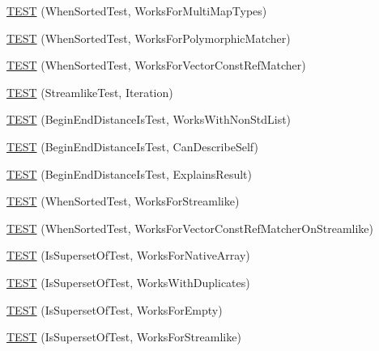\begin{DoxyCompactItemize}
\item 
\mbox{\hyperlink{namespacetesting_1_1gmock__matchers__test_ab5de36ad02781be67163ae24d08b5454}{T\+E\+ST}} (When\+Sorted\+Test, Works\+For\+Multi\+Map\+Types)
\item 
\mbox{\hyperlink{namespacetesting_1_1gmock__matchers__test_a587c3799433426782ccdcfe5cb07f5bc}{T\+E\+ST}} (When\+Sorted\+Test, Works\+For\+Polymorphic\+Matcher)
\item 
\mbox{\hyperlink{namespacetesting_1_1gmock__matchers__test_a0975bae51ce06a819dc1437134fd7f05}{T\+E\+ST}} (When\+Sorted\+Test, Works\+For\+Vector\+Const\+Ref\+Matcher)
\item 
\mbox{\hyperlink{namespacetesting_1_1gmock__matchers__test_a5aa4eed927d4a1a8ea306d5e47dce94f}{T\+E\+ST}} (Streamlike\+Test, Iteration)
\item 
\mbox{\hyperlink{namespacetesting_1_1gmock__matchers__test_add74820690e798ae8a365d08b68ddf71}{T\+E\+ST}} (Begin\+End\+Distance\+Is\+Test, Works\+With\+Non\+Std\+List)
\item 
\mbox{\hyperlink{namespacetesting_1_1gmock__matchers__test_aa4ef2a94a7d75aa6116e8537deaa5f56}{T\+E\+ST}} (Begin\+End\+Distance\+Is\+Test, Can\+Describe\+Self)
\item 
\mbox{\hyperlink{namespacetesting_1_1gmock__matchers__test_a89445da783c74dfa09c9c09531646f5b}{T\+E\+ST}} (Begin\+End\+Distance\+Is\+Test, Explains\+Result)
\item 
\mbox{\hyperlink{namespacetesting_1_1gmock__matchers__test_a8de8e3760418cfcd33913cd30f16d117}{T\+E\+ST}} (When\+Sorted\+Test, Works\+For\+Streamlike)
\item 
\mbox{\hyperlink{namespacetesting_1_1gmock__matchers__test_aa6bfe7b6cc288d93f60b9f52e095b233}{T\+E\+ST}} (When\+Sorted\+Test, Works\+For\+Vector\+Const\+Ref\+Matcher\+On\+Streamlike)
\item 
\mbox{\hyperlink{namespacetesting_1_1gmock__matchers__test_a1f8296847490a883c0e86f8f90e4c6d5}{T\+E\+ST}} (Is\+Superset\+Of\+Test, Works\+For\+Native\+Array)
\item 
\mbox{\hyperlink{namespacetesting_1_1gmock__matchers__test_a1ae4040ea2af432956d7486bb3f85286}{T\+E\+ST}} (Is\+Superset\+Of\+Test, Works\+With\+Duplicates)
\item 
\mbox{\hyperlink{namespacetesting_1_1gmock__matchers__test_a979b33284277cfca18fe91af3892667a}{T\+E\+ST}} (Is\+Superset\+Of\+Test, Works\+For\+Empty)
\item 
\mbox{\hyperlink{namespacetesting_1_1gmock__matchers__test_a2606545708e4ce6d38284c66109f604d}{T\+E\+ST}} (Is\+Superset\+Of\+Test, Works\+For\+Streamlike)

\end{DoxyCompactItemize}
